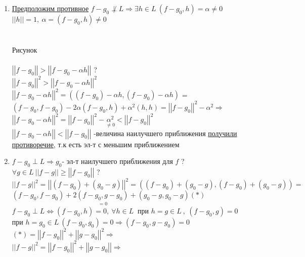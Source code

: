 \begin{enumerate}
 \item \underline{Предположим противное} $f-g_0 \not \perp  L \Rightarrow \exists h \in L\ (f-g_0,h)=\alpha \ne 0 $ \\
       $\left| \left| h \right| \right|=1, \ \alpha=(f-g_0,h) \ne 0 $ \\
       \\ \\ Рисунок \\ \\
       $\left| \left| f-g_0 \right| \right|>\left| \left| f-g_0-\alpha h \right| \right|$ ? \\
       $\left| \left| f-g_0 \right| \right|^2>\left| \left| f-g_0-\alpha h \right| \right|^2$ \\
       $\left| \left| f-g_0-\alpha h \right| \right|^2 = \left( (f-g_0)-\alpha h , (f-g_0)-\alpha h \right)$ = 
       $(f-g_0,f-g_0)-2 \alpha (f-g_0,h) + \alpha^2 (h,h) = \left| \left| f-g_0 \right| \right|^2 -\alpha^2 \Rightarrow$
       $\left| \left| f-g_0-\alpha h \right| \right|^2 = \left| \left| f-g_0 \right| \right|^2 - \underset {\ne 0}{\alpha^2} < \left| \left| f-g_0 \right| \right|^2  $ \\
       $\left| \left| f-g_0-\alpha h \right| \right| < \left| \left| f-g_0 \right| \right|$ -величина наилучшего приближения 
       \underline{получили противоречие}, т.к есть эл-т с меньшим приближением
 \item $f-g_0 \perp L \Rightarrow g_0$- эл-т наилучшего приближения для $f$ ? \\
       $\forall g \in L\ \left| \left| f-g \right| \right| \ge \left| \left| f-g_0 \right| \right| $ ? \\
       $\left| \left| f-g \right| \right|^2 = \left| \left| (f-g_0)+(g_0-g) \right| \right|^2 = \left( (f-g_0) + (g_0-g), (f-g_0)+(g_0-g) \right) = $\\
       $(f-g_0,f-g_0)+2 \underset{=0}{(f-g_0,g-g_0)} + (g_0-g,g_0-g) (*)$ \\
       $f-g_0 \perp L \Leftrightarrow (f-g_0,h)=0, \ \forall h \in L\ $ при $h=g \in L\ , \ (f-g_0,g)=0$ \\
       при $h=g_0 \in L\ (f-g_0,g_0)=0 \Rightarrow (f-g_0,g-g_0)=0$ \\
       $(*) = \left| \left| f-g_0 \right| \right|^2 + \left| \left| g-g_0 \right| \right|^2 \Rightarrow$ \\
       $\left| \left| f-g \right| \right|^2 = \left| \left| f-g_0 \right| \right|^2 + \left| \left| g-g_0 \right| \right| \Rightarrow $ \\

\end{enumerate}
